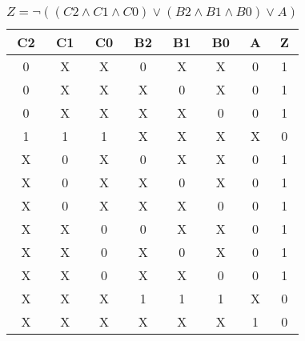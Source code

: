 \begin{center}
    \begin{table}[h] \caption{\(Z = \lnot ((C2 \land C1 \land C0) \lor (B2 \land B1 \land B0) \lor A) \)}
        \begin{center}
            \begin{tabular}{|c|c|c|c|c|c|c||c|} \hline
            C2 & C1 & C0 & B2 & B1 & B0 & A & Z \\ \hline\hline
            0  & X  & X  & 0  & X  & X  & 0 & 1 \\ \hline
            0  & X  & X  & X  & 0  & X  & 0 & 1 \\ \hline
            0  & X  & X  & X  & X  & 0  & 0 & 1 \\ \hline
            1  & 1  & 1  & X  & X  & X  & X & 0 \\ \hline
            X  & 0  & X  & 0  & X  & X  & 0 & 1 \\ \hline
            X  & 0  & X  & X  & 0  & X  & 0 & 1 \\ \hline
            X  & 0  & X  & X  & X  & 0  & 0 & 1 \\ \hline
            X  & X  & 0  & 0  & X  & X  & 0 & 1 \\ \hline
            X  & X  & 0  & X  & 0  & X  & 0 & 1 \\ \hline
            X  & X  & 0  & X  & X  & 0  & 0 & 1 \\ \hline
            X  & X  & X  & 1  & 1  & 1  & X & 0 \\ \hline
            X  & X  & X  & X  & X  & X  & 1 & 0 \\ \hline
            \end{tabular}
        \end{center}
    \end{table}
\end{center}
